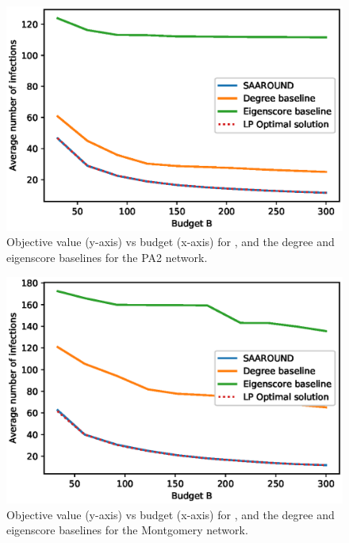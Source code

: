 \begin{figure}[!h]
    \centering
    \includegraphics[scale = 0.55]{Figuresnew/barabasi_approx}
    \caption{Objective value (y-axis) vs budget (x-axis) for \algo{}, and the degree and eigenscore baselines for the PA2 network.}
    \label{fig:pa2approx}
\end{figure}

\begin{figure}[!h]
    \centering
    \includegraphics[scale = 0.6]{Figuresnew/mont_approx}
    \caption{Objective value (y-axis) vs budget (x-axis) for \algo{}, and the degree and eigenscore baselines for the Montgomery network.}
    \label{fig:mont-approx}
\end{figure}

